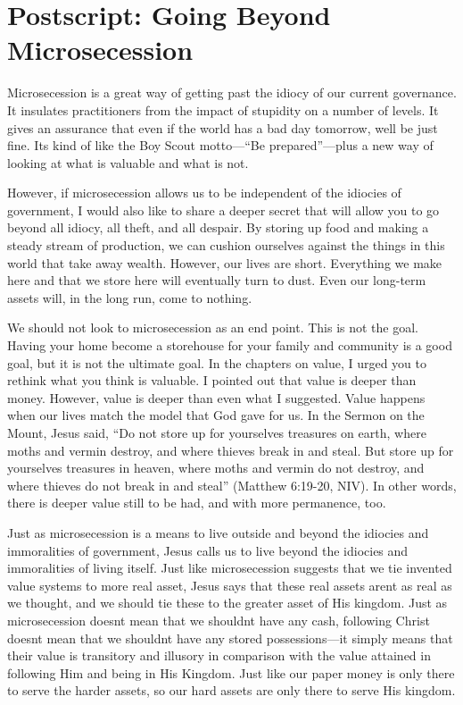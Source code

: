 
\chapter{Postscript: Going Beyond Microsecession}


Microsecession is a great way of getting past the idiocy of our current
governance. It insulates practitioners from the impact of stupidity on
a number of levels. It gives an assurance that even if the world has a
bad day tomorrow, we{\textquotesingle}ll be just fine.
It{\textquotesingle}s kind of like the Boy Scout motto—“Be
prepared”—plus a new way of looking at what is valuable and what is
not.


However, if microsecession allows us to be independent of the idiocies
of government, I would also like to share a deeper secret that
will allow you to go
beyond all idiocy, all theft, and all despair.  By storing up food and
making a steady stream of production, we can cushion ourselves against
the things in this world that take away wealth. However, our lives are
short. Everything we make here and that we store here will eventually
turn to dust. Even our long-term assets will, in the long run, come to
nothing.


We should not look to microsecession as an end point. This is not the
goal. Having your home become a storehouse for your family and
community is a good goal, but it is not the ultimate goal. In the
chapters on value, I urged you to rethink what you think is valuable. I
pointed out that value is deeper than money. However, value is deeper
than even what I suggested. Value happens when our lives match the
model that God gave for us. In the Sermon on the Mount, Jesus said, “Do
not store up for yourselves treasures on earth, where moths and vermin
destroy, and where thieves break in and steal. But store up for
yourselves treasures in heaven, where moths and vermin do not destroy,
and where thieves do not break in and steal” (Matthew 6:19-20, NIV). In
other words, there is deeper value still to be had, and with more
permanence, too.


Just as microsecession is a means to live outside and beyond the
idiocies and immoralities of government, Jesus calls us to live beyond
the idiocies and immoralities of living itself. Just like
microsecession suggests that we tie invented value systems to more real
asset, Jesus says that these real assets aren{\textquotesingle}t as
real as we thought, and we should tie these to the greater asset of His
kingdom. Just as microsecession doesn{\textquotesingle}t mean that we
shouldn{\textquotesingle}t have any cash, following Christ
doesn{\textquotesingle}t mean that we shouldn{\textquotesingle}t have
any stored possessions—it simply means that their value is transitory
and illusory in comparison with the value attained in following
Him and being in His
Kingdom. Just like our paper money is only there to serve the harder
assets, so our hard assets are only there to serve His kingdom.


